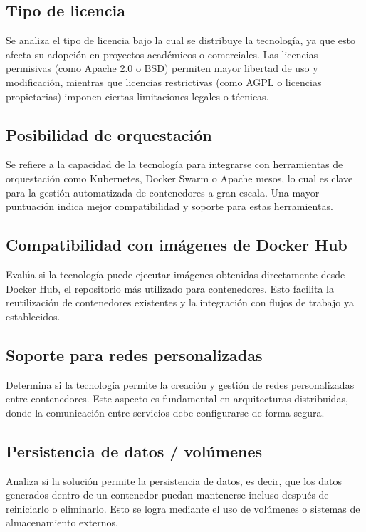 \subsection{Tipo de licencia}
\noindent
Se analiza el tipo de licencia bajo la cual se distribuye la tecnología, ya que esto afecta su adopción en proyectos académicos o comerciales. Las licencias permisivas (como Apache 2.0 o BSD) permiten mayor libertad de uso y modificación, mientras que licencias restrictivas (como AGPL o licencias propietarias) imponen ciertas limitaciones legales o técnicas.

\subsection{Posibilidad de orquestación}\label{sec:posibilidad-orquestacion}
\noindent
Se refiere a la capacidad de la tecnología para integrarse con herramientas de orquestación como Kubernetes, Docker Swarm o Apache mesos, lo cual es clave para la gestión automatizada de contenedores a gran escala. Una mayor puntuación indica mejor compatibilidad y soporte para estas herramientas.

\subsection{Compatibilidad con imágenes de Docker Hub}
\noindent
Evalúa si la tecnología puede ejecutar imágenes obtenidas directamente desde Docker Hub, el repositorio más utilizado para contenedores. Esto facilita la reutilización de contenedores existentes y la integración con flujos de trabajo ya establecidos.

\subsection{Soporte para redes personalizadas}
\noindent
Determina si la tecnología permite la creación y gestión de redes personalizadas entre contenedores. Este aspecto es fundamental en arquitecturas distribuidas, donde la comunicación entre servicios debe configurarse de forma segura.

\subsection{Persistencia de datos / volúmenes}
\noindent
Analiza si la solución permite la persistencia de datos, es decir, que los datos generados dentro de un contenedor puedan mantenerse incluso después de reiniciarlo o eliminarlo. Esto se logra mediante el uso de volúmenes o sistemas de almacenamiento externos.

